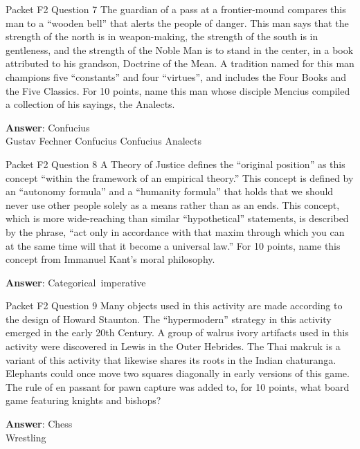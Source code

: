 \begin{frame}{Packet F2 Question 7}
The guardian of a pass at a frontier-mound compares this man to a “wooden bell” that alerts the people of danger. This man says that the strength of the north is in weapon-making, the strength of the south is in gentleness, and the strength of the Noble Man is to stand in the center, in a book attributed to his grandson, Doctrine of the Mean. A tradition named for this man champions five “constants” and four “virtues”, and includes the Four Books and the Five Classics. For 10 points, name this man whose disciple Mencius compiled a collection of his sayings,   the Analects.      

\textbf{Answer}: Confucius\\
 Gustav Fechner
 Confucius
 Confucius
 Analects
\end{frame}

\begin{frame}{Packet F2 Question 8}
A Theory of Justice defines the “original position” as this concept “within the framework of an empirical theory.” This concept is defined by an “autonomy formula” and a “humanity formula” that holds that   we should never use other people solely as a means rather than as an ends. This concept, which is more wide-reaching than similar “hypothetical” statements, is described by the phrase, “act only in accordance with that maxim through which you can at the same time will that it become a universal law.”   For 10 points,   name this concept from Immanuel Kant’s moral   philosophy.

\textbf{Answer}: Categorical\ imperative\\
\end{frame}

\begin{frame}{Packet F2 Question 9}
Many objects used in this activity are made according to the design of Howard Staunton. The “hypermodern” strategy in this activity emerged in the early 20th Century. A group of walrus ivory artifacts used in this activity were discovered in Lewis in the Outer Hebrides. The Thai makruk is a variant of this activity that likewise shares its roots in the Indian chaturanga. Elephants could once move two squares diagonally in early versions of this game. The rule   of en passant for   pawn capture was added to, for 10 points, what board game featuring   knights and bishops?  

\textbf{Answer}: Chess\\
 Wrestling
\end{frame}

